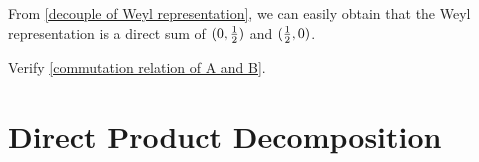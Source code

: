 From \eqref{decouple of Weyl representation}, we can easily obtain that the Weyl representation is a direct sum of $(0,\frac{1}{2})$ and $(\frac{1}{2},0)$. 


\begin{Exe}
Verify \eqref{commutation relation of A and B}.
\end{Exe}

\section{Direct Product Decomposition}

